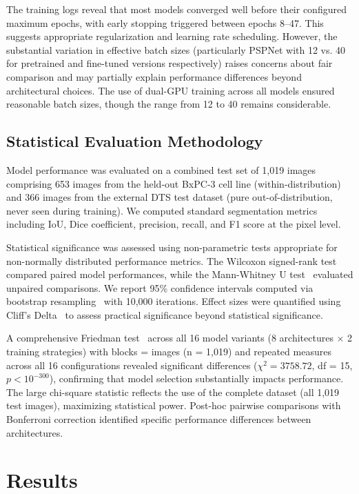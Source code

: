 \documentclass[preprint,12pt]{elsarticle}
\newcommand{\dsDTS}{DTS}
\begin{document}
The training logs reveal that most models converged well before their configured maximum epochs, with early stopping triggered between epochs 8–47. This suggests appropriate regularization and learning rate scheduling. However, the substantial variation in effective batch sizes (particularly PSPNet with 12 vs. 40 for pretrained and fine-tuned versions respectively) raises concerns about fair comparison and may partially explain performance differences beyond architectural choices. The use of dual-GPU training across all models ensured reasonable batch sizes, though the range from 12 to 40 remains considerable.

\subsection{Statistical Evaluation Methodology}
\label{subsec:evaluation}

Model performance was evaluated on a combined test set of 1,019 images comprising 653 images from the held-out BxPC-3 cell line (within-distribution) and 366 images from the external \dsDTS{} test dataset (pure out-of-distribution, never seen during training). We computed standard segmentation metrics including IoU, Dice coefficient, precision, recall, and F1 score at the pixel level.

Statistical significance was assessed using non-parametric tests appropriate for non-normally distributed performance metrics. The Wilcoxon signed-rank test~\cite{Wilcoxon1945} compared paired model performances, while the Mann-Whitney U test~\cite{MannWhitney1947} evaluated unpaired comparisons. We report 95\% confidence intervals computed via bootstrap resampling~\cite{Efron1979} with 10,000 iterations. Effect sizes were quantified using Cliff's Delta~\cite{Cliff1993} to assess practical significance beyond statistical significance.

A comprehensive Friedman test~\cite{Friedman1937} across all 16 model variants (8 architectures × 2 training strategies) with blocks = images (n = 1,019) and repeated measures across all 16 configurations revealed significant differences ($\chi^2 = 3758.72$, df = 15, $p < 10^{-300}$), confirming that model selection substantially impacts performance. The large chi-square statistic reflects the use of the complete dataset (all 1,019 test images), maximizing statistical power. Post-hoc pairwise comparisons with Bonferroni correction identified specific performance differences between architectures.

\section{Results}
\label{sec:results}
\end{document}
